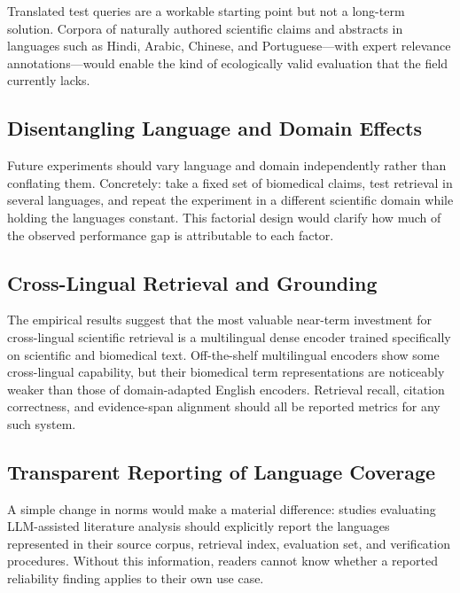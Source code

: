 \documentclass[acmsmall,screen,review]{acmart}
\begin{document}
Translated test queries are a workable starting point but not a long-term
solution.  Corpora of naturally authored scientific claims and abstracts in
languages such as Hindi, Arabic, Chinese, and Portuguese---with expert
relevance annotations---would enable the kind of ecologically valid
evaluation that the field currently lacks.

\subsection{Disentangling Language and Domain Effects}
\label{sec:disentangle-gap}

Future experiments should vary language and domain independently rather
than conflating them.  Concretely: take a fixed set of biomedical claims,
test retrieval in several languages, and repeat the experiment in a
different scientific domain while holding the languages constant.  This
factorial design would clarify how much of the observed performance gap is
attributable to each factor.

\subsection{Cross-Lingual Retrieval and Grounding}
\label{sec:verification-gap}

The empirical results suggest that the most valuable near-term
investment for cross-lingual scientific retrieval is a multilingual dense
encoder trained specifically on scientific and biomedical text.
Off-the-shelf multilingual encoders show some cross-lingual capability,
but their biomedical term representations are noticeably weaker than those
of domain-adapted English encoders.  Retrieval recall, citation
correctness, and evidence-span alignment should all be reported metrics for
any such system.

\subsection{Transparent Reporting of Language Coverage}
\label{sec:reporting-gap}

A simple change in norms would make a material difference: studies
evaluating LLM-assisted literature analysis should explicitly report the
languages represented in their source corpus, retrieval index, evaluation
set, and verification procedures.  Without this information, readers
cannot know whether a reported reliability finding applies to their own
use case.
\end{document}
